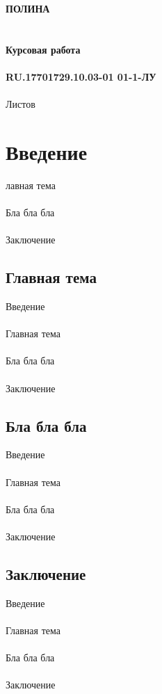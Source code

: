 \documentclass{article}
\begin{document}
\fontsize{14}{16}\selectfont
\thispagestyle{empty}
\clearpage
{}
\bigskip
\begin{center}
\topskip=0pt
\vspace*{\fill}
\textbf{ПОЛИНА~\\
~\\
~\\
Курсовая работа\\
~\\
RU.17701729.10.03-01 01-1-ЛУ}\\
~\\
Листов \ztotpages\\
\vspace*{\fill}
\end{center}
\begin{center}
\end{center}
\newpage
\tableofcontents
\newpage
\newpage
\section{Введение}
лавная тема\\
~\\
Бла бла бла\\
~\\
Заключение
\subsection{Главная тема}
Введение\\
~\\
Главная тема\\
~\\
Бла бла бла\\
~\\
Заключение
\subsection{Бла бла бла}
Введение\\
~\\
Главная тема\\
~\\
Бла бла бла\\
~\\
Заключение
\subsection{Заключение}
Введение\\
~\\
Главная тема\\
~\\
Бла бла бла\\
~\\
Заключение\\
~\\
\end{document}
